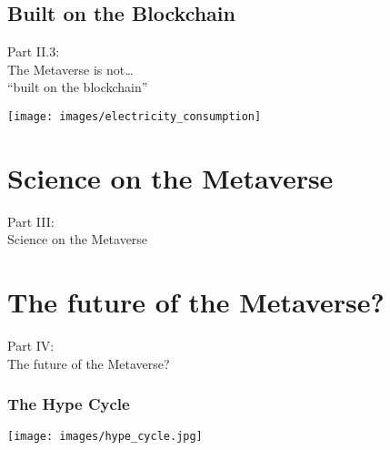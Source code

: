 \documentclass[aspectratio=169,x11names]{beamer}
\begin{document}
\subsection{Built on the Blockchain}

\begin{frame}
\begin{center}
\Large
Part II.3:\bigskip\\
\huge
The Metaverse is not\dots\\ ``built on the blockchain''
\end{center}
\end{frame}

\begin{frame}
\begin{center}
\texttt{[image: images/electricity\_consumption]} 
\end{center}
\end{frame}

\section{Science on the Metaverse}

\begin{frame}
\begin{center}
\Large
Part III:\bigskip\\
\huge
Science on the Metaverse
\end{center}
\end{frame}

\section{The future of the Metaverse?}

\begin{frame}
\begin{center}
\Large
Part IV:\bigskip\\
\huge
The future of the Metaverse?
\end{center}
\end{frame}

\begin{frame}
\frametitle{The Hype Cycle}
\begin{center}
\texttt{[image: images/hype\_cycle.jpg]} 
\end{center}
\end{frame}
\end{document}
